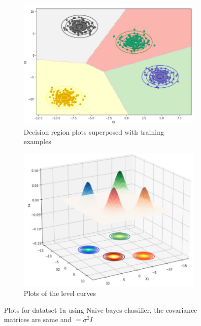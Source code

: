 \documentclass[11pt]{article}
\begin{document}
\begin{figure}[h]
\centering
	\begin{subfigure}[b]{0.45\textwidth}
	\centering
	\includegraphics[scale=0.3]{dataset1a_sigmaI_nb_2D.jpg}
	\caption{Decision region plots superposed with training examples}
	\label{fig:fig2.2.3.1}
	\end{subfigure}
	\hfill
	\begin{subfigure}[b]{0.45\textwidth}
	\centering
	\includegraphics[scale=0.3]{dataset1a_sigmaI_nb_3D.jpg}
	\caption{Plots of the level curves}
	\label{fig:fig2.2.3.2}
	\end{subfigure}
\caption{Plots for datatset 1a using Naive bayes classifier, the covariance matrices are same and $= \sigma^2 I$}
\label{fig:fig1.2.1}
\end{figure}
\end{document}
